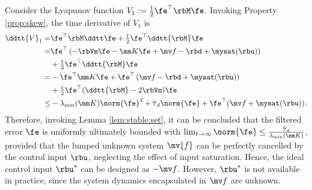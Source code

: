 \documentclass[letterpaper, journal]{IEEEtran}
\begin{document}
Consider the Lyapunov function $V_1:= \tfrac{1}{2}\fe^\top \rbM\fe$. 
Invoking Property \ref{prop:skew}, the time derivative of $V_1$ is
\begin{equation}
    \begin{aligned}
        \ddtt{V}_1
        =&
        \fe^\top \rbM \ddtt \fe
        +
        \tfrac{1}{2}\fe^\top \ddtt{\rbM}\fe
        \\
        =&
        \fe^\top 
        \left(
            -\rbVm \fe -\mm K \fe + \mv f
            -\rbd + \mysat(\rbu)
        \right)
        \\
        &
        +
        \tfrac{1}{2}
        \fe^\top \ddtt{\rbM}\fe
        \\
        =&
        -
        \fe^\top \mm K \fe 
        +
        \fe^\top 
        \left(
            \mv f
            -\rbd
            +\mysat(\rbu)
        \right)
        \\
        &
        +
        \tfrac{1}{2}
        \fe^\top(\ddtt{\rbM}- 2\rbVm)\fe
        \\
        \le&
        -\lambda_{\min}(\mm K)\norm{\fe}^2
        +
        \overline\tau_d\norm{\fe}
        +
        \fe^\top (\mv f+\mysat(\rbu))
        .
    \end{aligned}
    \label{eq:lya1:dot1}
\end{equation} 
Therefore, invoking Lemma \ref{lem:stable:set}, it can be concluded that the filtered error $\fe$ is uniformly ultimately bounded with $\lim_{t\to\infty}\norm{\fe}\le\tfrac{\overline\tau_d}{\lambda_{\min}(\mm K)}$, provided that the lumped unknown system $\mv{f}$ can be perfectly cancelled by the control input $\rbu$, neglecting the effect of input saturation.
Hence, the ideal control input $\rbu^*$ can be designed as $-\mv f$.
However, $\rbu^*$ is not available in practice, since the system dynamics encapsulated in $\mv f$ are unknown.
\end{document}
